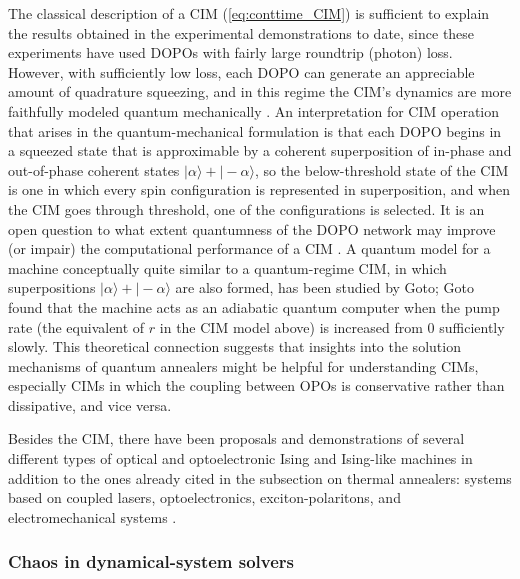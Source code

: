 \documentclass[fleqn,10pt]{wlscirep}
\def\change#1{#1}
\begin{document}
The classical description of a CIM (\ref{eq:conttime_CIM}) is sufficient to explain the results obtained in the experimental demonstrations\cite{marandi2014network,takata201616,inagaki2016large,mcmahon2016fully,inagaki2016coherent,hamerly2019experimental,okawachi2020demonstration} to date, since these experiments have used DOPOs with fairly large roundtrip (photon) loss. However, with sufficiently low loss, each DOPO can generate an appreciable amount of quadrature squeezing, and in this regime the CIM's dynamics are more faithfully modeled quantum mechanically \cite{yamamoto2017coherent}. 
An interpretation for CIM operation that arises in the quantum-mechanical formulation is that each DOPO begins in a squeezed state that is approximable by a coherent superposition of in-phase and out-of-phase coherent states $| \alpha \rangle + |-\alpha \rangle$, so the below-threshold state of the CIM is one in which every spin configuration is represented in superposition, and when the CIM goes through threshold, one of the configurations is selected. 
It is an open question to what extent quantumness of the DOPO network may improve (or impair) the computational performance of a CIM \cite{yamamoto2020coherent}. A quantum model for a machine conceptually quite similar to a quantum-regime CIM, in which superpositions $| \alpha \rangle + |-\alpha \rangle$ are also formed, has been studied by Goto\cite{goto2016bifurcation}; Goto found that the machine acts as an adiabatic quantum computer when the pump rate (the equivalent of $r$ in the CIM model above) is increased from 0 sufficiently slowly. This theoretical connection suggests that insights into the solution mechanisms of quantum annealers might be helpful for understanding CIMs, \change{especially CIMs in which the coupling between OPOs is conservative rather than dissipative,} and vice versa.

Besides the CIM, there have been proposals and demonstrations of several different types of optical and optoelectronic Ising and Ising-like machines in addition to the ones already cited in the subsection on thermal annealers: systems based on coupled lasers\cite{tamate2016simulating,babaeian2019single,parto2020realizing}, optoelectronics\cite{bohm2019poor}, exciton-polaritons\cite{lagoudakis2017polariton,berloff2017realizing,kalinin2018global,kalinin2018simulating,kyriienko2019probabilistic}, and electromechanical systems \cite{mahboob2016electromechanical, tezak2019integrated}. 

\subsubsection*{Chaos in dynamical-system solvers}
\end{document}
